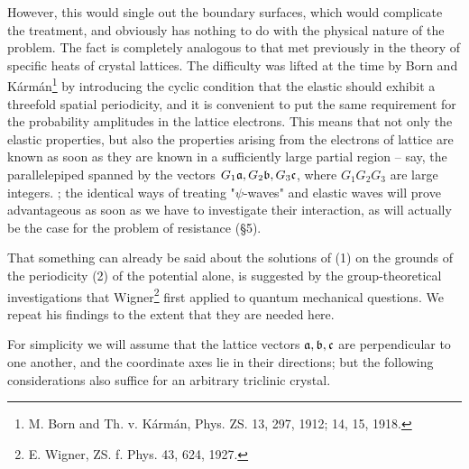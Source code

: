 \begin{paper}{1}
However, this would single out the boundary surfaces, which would complicate the treatment, and obviously has nothing to do with the physical nature of the problem. The fact is completely analogous to that met previously in the theory of specific heats of crystal lattices. The difficulty was lifted at the time by Born and K\'arm\'an\footnote{M. Born and Th. v. K\'arm\'an, Phys. ZS. 13, 297, 1912; 14, 15, 1918.} by introducing the cyclic condition that the elastic  should exhibit a threefold spatial periodicity, and it is convenient to put the same requirement for the probability amplitudes in the lattice electrons. This means that not only the elastic properties, but also the properties arising from the electrons of  lattice are known as soon as they are known in a sufficiently large partial region -- say, the parallelepiped spanned by the vectors $G_1\mathfrak{a},G_2\mathfrak{b},G_3\mathfrak{c}$, where $G_1G_2G_3$ are large integers. ; the identical ways of treating "$\psi$-waves" and elastic waves will prove advantageous as soon as we have to investigate their interaction, as will actually be the case for the problem of resistance (\S5).

That something can already be said about the solutions of (1) on the grounds of the periodicity (2) of the potential alone, is suggested by the group-theoretical investigations that Wigner\footnote{E. Wigner, ZS. f. Phys. 43, 624, 1927.} first applied to quantum mechanical questions. We repeat his findings to the extent that they are needed here.

For simplicity we will assume that the lattice vectors $\mathfrak{a},\mathfrak{b},\mathfrak{c}$ are perpendicular to one another, and the coordinate axes lie in their directions; but the following considerations also suffice for an arbitrary triclinic crystal.


\end{paper}
